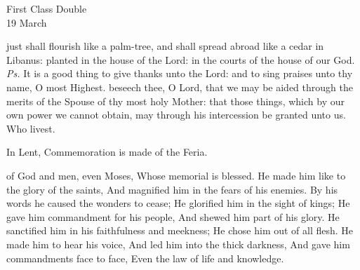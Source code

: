 \begin{inhead}
    {First Class Double\\
19 March}
\end{inhead}

\introit
{} just shall flourish like a palm-tree, and shall spread abroad like a cedar in Libanus: planted in the house of the Lord: in the courts of the house of our God. \textit{Ps.} It is a good thing to give thanks unto the Lord: and to sing praises unto thy name, O most Highest.
\collect
{} beseech thee, O Lord, that we may be aided through the merits of the Spouse of thy most holy Mother: that those things, which by our own power we cannot obtain, may through his intercession be granted unto us. Who livest.
\begin{rubric}
    In Lent, Commemoration is made of the Feria.
\end{rubric}
 of God and men, even Moses, Whose memorial is blessed. He made him like to the glory of the saints, And magnified him in the fears of his enemies. By his words he caused the wonders to cease; He glorified him in the sight of kings; He gave him commandment for his people, And shewed him part of his glory. He sanctified him in his faithfulness and meekness; He chose him out of all flesh. He made him to hear his voice, And led him into the thick darkness, And gave him commandments face to face, Even the law of life and knowledge.


